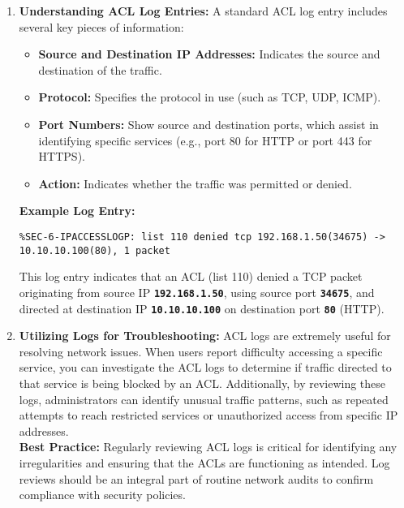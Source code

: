 \documentclass[11pt,a4paper]{article}
\begin{document}
        \begin{enumerate}
            \item \textbf{Understanding ACL Log Entries:} A standard ACL log entry includes several key pieces of information:
                \begin{itemize}
                    \item \textbf{Source and Destination IP Addresses:} Indicates the source and destination of the traffic.

                    \item \textbf{Protocol:} Specifies the protocol in use (such as TCP, UDP, ICMP).

                    \item \textbf{Port Numbers:} Show source and destination ports, which assist in identifying specific services (e.g., port 80 for HTTP or port 443 for HTTPS).

                    \item \textbf{Action:} Indicates whether the traffic was permitted or denied.

                \end{itemize}
                \textbf{Example Log Entry:}
\begin{lstlisting}
%SEC-6-IPACCESSLOGP: list 110 denied tcp 192.168.1.50(34675) -> 10.10.10.100(80), 1 packet                                                                        
\end{lstlisting}
                This log entry indicates that an ACL (list 110) denied a TCP packet originating from source IP \textbf{\lstinline{192.168.1.50}}, using source port \textbf{\lstinline{34675}}, and directed at destination IP \textbf{\lstinline{10.10.10.100}} on destination port \textbf{\lstinline{80}} (HTTP).

            \item \textbf{Utilizing Logs for Troubleshooting:} ACL logs are extremely useful for resolving network issues. When users report difficulty accessing a specific service, you can investigate the ACL logs to determine if traffic directed to that service is being blocked by an ACL. Additionally, by reviewing these logs, administrators can identify unusual traffic patterns, such as repeated attempts to reach restricted services or unauthorized access from specific IP addresses.
            \\[1em]
            \textbf{Best Practice:} Regularly reviewing ACL logs is critical for identifying any irregularities and ensuring that the ACLs are functioning as intended. Log reviews should be an integral part of routine network audits to confirm compliance with security policies.

        \end{enumerate}
\end{document}
